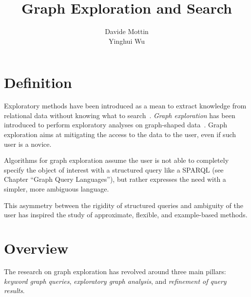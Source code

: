 \documentclass[graybox, natbib, nosecnum, twocolumn]{svmult}
\begin{document}
\title*{Graph Exploration and Search}
\author{Davide Mottin \\ Yinghui Wu}
%
%
\maketitle


\section{Definition}

Exploratory methods have been introduced as a mean to extract knowledge from relational data without knowing what to search~\citep{idreos2015overview}. 
\emph{Graph exploration} has been introduced to perform exploratory analyses on graph-shaped data~\citep{mottin2017graph}. 
Graph exploration aims at mitigating the access to the data to the user, even if such user is a novice. 

Algorithms for graph exploration assume the user is not able to completely specify the object of interest with  a structured query  like a SPARQL %
(see Chapter ``Graph Query Languages''), 
but rather expresses the need with a simpler, more ambiguous language.

This asymmetry between the rigidity of structured queries and ambiguity of the user has inspired the study of approximate, flexible, and example-based methods. 


\section{Overview}

The research on graph exploration has revolved around three main pillars: \emph{keyword graph queries}, \emph{exploratory graph analysis}, and \emph{refinement of query results}.  
\end{document}
